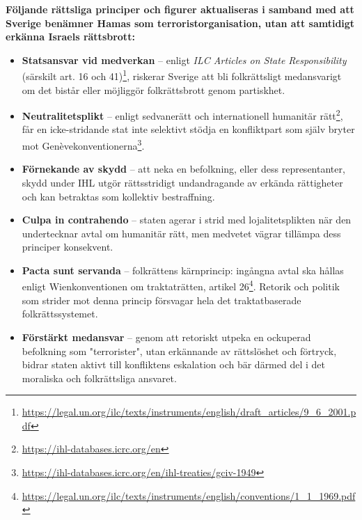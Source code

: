 \documentclass[12pt]{article}
\begin{document}
\begin{tcolorbox}[title=Rättsfigurer som aktualiseras vid terroristutpekning, colback=gray!10, colframe=black, sharp corners=south]
\textbf{Följande rättsliga principer och figurer aktualiseras i samband med att Sverige benämner Hamas som terroristorganisation, utan att samtidigt erkänna Israels rättsbrott:}

\begin{itemize}
    \item \textbf{Statsansvar vid medverkan} – enligt \textit{ILC Articles on State Responsibility} (särskilt art. 16 och 41)\footnote{\url{https://legal.un.org/ilc/texts/instruments/english/draft_articles/9_6_2001.pdf}}, riskerar Sverige att bli folkrättsligt medansvarigt om det bistår eller möjliggör folkrättsbrott genom partiskhet.
    
    \item \textbf{Neutralitetsplikt} – enligt sedvanerätt och internationell humanitär rätt\footnote{\url{https://ihl-databases.icrc.org/en}}, får en icke-stridande stat inte selektivt stödja en konfliktpart som själv bryter mot Genèvekonventionerna\footnote{\url{https://ihl-databases.icrc.org/en/ihl-treaties/gciv-1949}}.
    
    \item \textbf{Förnekande av skydd} – att neka en befolkning, eller dess representanter, skydd under IHL utgör rättsstridigt undandragande av erkända rättigheter och kan betraktas som kollektiv bestraffning.
    
    \item \textbf{Culpa in contrahendo} – staten agerar i strid med lojalitetsplikten när den undertecknar avtal om humanitär rätt, men medvetet vägrar tillämpa dess principer konsekvent.
    
    \item \textbf{Pacta sunt servanda} – folkrättens kärnprincip: ingångna avtal ska hållas enligt Wienkonventionen om traktaträtten, artikel 26\footnote{\url{https://legal.un.org/ilc/texts/instruments/english/conventions/1_1_1969.pdf}}. Retorik och politik som strider mot denna princip försvagar hela det traktatbaserade folkrättssystemet.
    
    \item \textbf{Förstärkt medansvar} – genom att retoriskt utpeka en ockuperad befolkning som "terrorister", utan erkännande av rättslöshet och förtryck, bidrar staten aktivt till konfliktens eskalation och bär därmed del i det moraliska och folkrättsliga ansvaret.
\end{itemize}
\end{tcolorbox}
\end{document}
